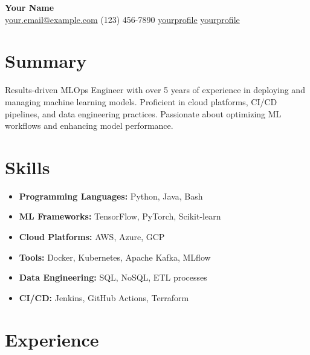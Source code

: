 \documentclass[a4paper,10pt]{article}
\begin{document}
\begin{center}
    {\LARGE \textbf{Your Name}} \\
    \vspace{2mm}
    \faEnvelope \hspace{1mm} \href{mailto:your.email@example.com}{your.email@example.com} \hspace{5mm}
    \faPhone \hspace{1mm} (123) 456-7890 \hspace{5mm}
    \faLinkedin \hspace{1mm} \href{https://www.linkedin.com/in/yourprofile}{yourprofile} \hspace{5mm}
    \faGithub \hspace{1mm} \href{https://github.com/yourprofile}{yourprofile}
\end{center}

\section*{Summary}
Results-driven MLOps Engineer with over 5 years of experience in deploying and managing machine learning models. Proficient in cloud platforms, CI/CD pipelines, and data engineering practices. Passionate about optimizing ML workflows and enhancing model performance.

\section*{Skills}
\begin{itemize}[leftmargin=*]
    \item \textbf{Programming Languages:} Python, Java, Bash
    \item \textbf{ML Frameworks:} TensorFlow, PyTorch, Scikit-learn
    \item \textbf{Cloud Platforms:} AWS, Azure, GCP
    \item \textbf{Tools:} Docker, Kubernetes, Apache Kafka, MLflow
    \item \textbf{Data Engineering:} SQL, NoSQL, ETL processes
    \item \textbf{CI/CD:} Jenkins, GitHub Actions, Terraform
\end{itemize}

\section*{Experience}
\end{document}
